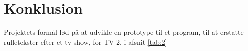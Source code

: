 \section{Konklusion}
Projektets formål lød på at udvikle en prototype til et program, til at erstatte rulletekster efter et tv-show, for TV 2. i afsnit \ref{tab:2}